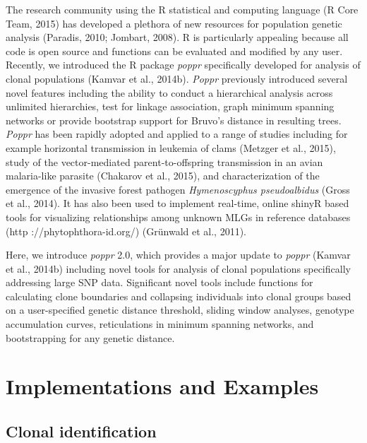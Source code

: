 \documentclass{frontiersSCNS} %
\begin{document}
The research community using the R statistical and computing language (R
Core Team, 2015) has developed a plethora of new resources for
population genetic analysis (Paradis, 2010; Jombart, 2008). R is
particularly appealing because all code is open source and functions can
be evaluated and modified by any user. Recently, we introduced the R
package \emph{poppr} specifically developed for analysis of clonal
populations (Kamvar et al., 2014b). \emph{Poppr} previously introduced
several novel features including the ability to conduct a hierarchical
analysis across unlimited hierarchies, test for linkage association,
graph minimum spanning networks or provide bootstrap support for Bruvo's
distance in resulting trees. \emph{Poppr} has been rapidly adopted and
applied to a range of studies including for example horizontal
transmission in leukemia of clams (Metzger et al., 2015), study of the
vector-mediated parent-to-offspring transmission in an avian
malaria-like parasite (Chakarov et al., 2015), and characterization of
the emergence of the invasive forest pathogen \emph{Hymenoscyphus
pseudoalbidus} (Gross et al., 2014). It has also been used to implement
real-time, online shinyR based tools for visualizing relationships among
unknown MLGs in reference databases (http ://phytophthora-id.org/)
(Gr{ü}nwald et al., 2011).

Here, we introduce \emph{poppr} 2.0, which provides a major update to
\emph{poppr} (Kamvar et al., 2014b) including novel tools for analysis
of clonal populations specifically addressing large SNP data.
Significant novel tools include functions for calculating clone
boundaries and collapsing individuals into clonal groups based on a
user-specified genetic distance threshold, sliding window analyses,
genotype accumulation curves, reticulations in minimum spanning
networks, and bootstrapping for any genetic distance.

\section*{Implementations and
Examples}\label{implementations-and-examples}

\subsection*{Clonal identification}\label{clonal-identification}
\end{document}
